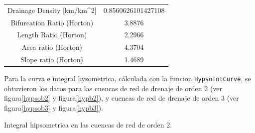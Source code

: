 \documentclass[11pt,]{article}
\begin{document}
\begin{longtable}[]{@{}cc@{}}
\begin{minipage}[t]{0.65\columnwidth}
Drainage Density {[}km/km\^{}2{]}\strut
\end{minipage} & \begin{minipage}[t]{0.29\columnwidth}\centering\strut
0.8560626101427108\strut
\end{minipage}\tabularnewline
\begin{minipage}[t]{0.65\columnwidth}\centering\strut
Bifurcation Ratio (Horton)\strut
\end{minipage} & \begin{minipage}[t]{0.29\columnwidth}\centering\strut
3.8876\strut
\end{minipage}\tabularnewline
\begin{minipage}[t]{0.65\columnwidth}\centering\strut
Length Ratio (Horton)\strut
\end{minipage} & \begin{minipage}[t]{0.29\columnwidth}\centering\strut
2.2966\strut
\end{minipage}\tabularnewline
\begin{minipage}[t]{0.65\columnwidth}\centering\strut
Area ratio (Horton)\strut
\end{minipage} & \begin{minipage}[t]{0.29\columnwidth}\centering\strut
4.3704\strut
\end{minipage}\tabularnewline
\begin{minipage}[t]{0.65\columnwidth}\centering\strut
Slope ratio (Horton)\strut
\end{minipage} & \begin{minipage}[t]{0.29\columnwidth}\centering\strut
1.4689\strut
\end{minipage}\tabularnewline
\bottomrule
\end{longtable}

Para la curva e integral hysometrica, cálculada con la funcion
\texttt{HypsoIntCurve}, se obtuvieron los datos para las cuencas de red
de drenaje de orden 2 (ver figura\ref{hypsob2} y figura\ref{hypb2}), y
cuencas de red de drenaje de orden 3 (ver figura\ref{hypsob3} y
figura\ref{hypb3}).

Integral hipsometrica en las cuencas de red de orden 2.
\end{document}

